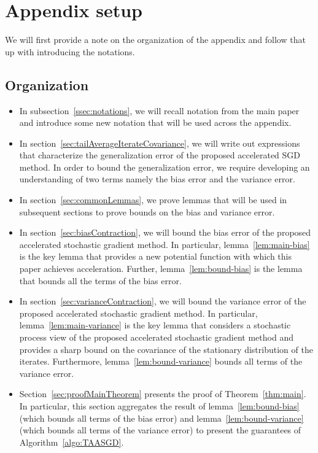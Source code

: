 \section{Appendix setup}
\label{sec:setup}
We will first provide a note on the organization of the appendix and follow that up with introducing the notations.

\subsection{Organization}
\label{ssec:org}
\begin{itemize}
\item In subsection~\ref{ssec:notations}, we will recall notation from the main paper and introduce some new notation that will be used across the appendix.
\item In section~\ref{sec:tailAverageIterateCovariance}, we will write out expressions that characterize the generalization error of the proposed accelerated SGD method. In order to bound the generalization error, we require developing an understanding of two terms namely the bias error and the variance error.
\item In section~\ref{sec:commonLemmas}, we prove lemmas that will be used in subsequent sections to prove bounds on the bias and variance error.
\item In section~\ref{sec:biasContraction}, we will bound the bias error of the proposed accelerated stochastic gradient method. In particular, lemma~\ref{lem:main-bias} is the key lemma that provides a new potential function with which this paper achieves acceleration. Further, lemma~\ref{lem:bound-bias} is the lemma that bounds all the terms of the bias error.
\item In section~\ref{sec:varianceContraction}, we will bound the variance error of the proposed accelerated stochastic gradient method. In particular, lemma~\ref{lem:main-variance} is the key lemma that considers a stochastic process view of the proposed accelerated stochastic gradient method and provides a sharp bound on the covariance of the stationary distribution of the iterates. Furthermore, lemma~\ref{lem:bound-variance} bounds all terms of the variance error.
\item Section~\ref{sec:proofMainTheorem} presents the proof of Theorem~\ref{thm:main}. In particular, this section aggregates the result of lemma~\ref{lem:bound-bias} (which bounds all terms of the bias error) and lemma~\ref{lem:bound-variance} (which bounds all terms of the variance error) to present the guarantees of Algorithm~\ref{algo:TAASGD}.
\end{itemize}

